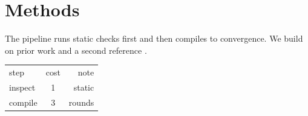 \section{Methods}
\label{sec:method}
The pipeline runs static checks first and then compiles to convergence.
We build on prior work \citep{sheng2021} and a second reference \citet{wang2020}.

\begin{tabular}{lcr}
\toprule
step & cost & note \\
inspect & 1 & static \\
compile & 3 & rounds \\
\bottomrule
\end{tabular}
